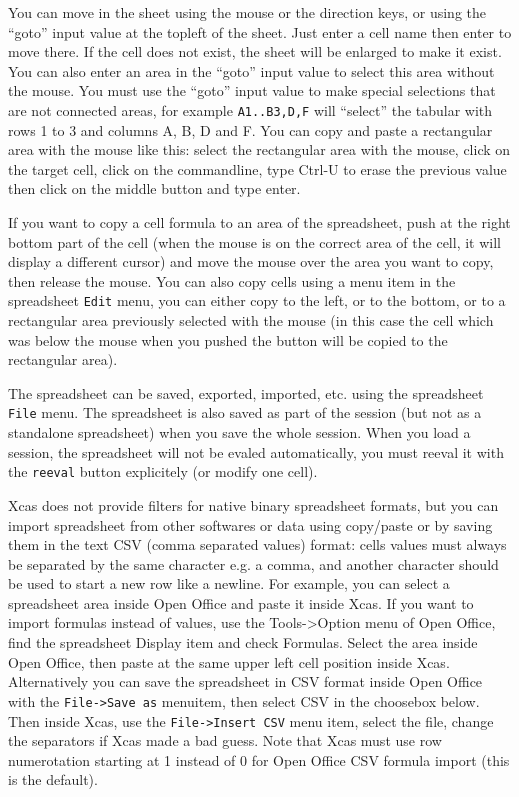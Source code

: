 \documentclass{article}
\begin{document}
You can move in the sheet using the mouse or the direction keys, or
using the ``goto'' input value at the topleft of the sheet. Just enter
a cell name then enter to move there. If the cell does not exist,
the sheet will be enlarged to make it exist. You can also enter
an area in the ``goto'' input value to select this area without the
mouse. You must use the ``goto'' input value to make special
selections that are not connected areas, for example \verb|A1..B3,D,F| will
``select'' the tabular with rows 1 to 3 and columns A, B, D and F.
You can copy and paste a rectangular area with the mouse like this:
select the rectangular area with the mouse, click on the target cell,
click on the commandline, type Ctrl-U to erase the previous
value then click on the middle button and type enter.

If you want to copy a cell formula to an area of the spreadsheet,
push at the right bottom part of the cell (when the mouse is on the
correct area of the cell, it will display a different cursor)
and move the mouse over the area you want to
copy, then release the mouse.
You can also copy cells using a menu item in the spreadsheet
\verb|Edit| menu, you can either copy to the left, or to the bottom,
or to a rectangular area previously selected with the mouse (in this
case the cell which was below the mouse when you pushed the button
will be copied to the rectangular area).

The spreadsheet can be saved, exported, imported, etc. using the
spreadsheet \verb|File| menu. The spreadsheet is also saved 
as part of the session (but not as a standalone spreadsheet)
when you save the whole session. When you load a session, the
spreadsheet will not be evaled automatically, you must reeval
it with the \verb|reeval| button explicitely (or modify one cell).

Xcas does not provide filters for native binary spreadsheet formats,
but you can import spreadsheet from other softwares or data using
copy/paste or by saving them in the text CSV (comma separated values) format:
cells values must always be separated by the same character e.g. a comma, and
another character should be used to start a new row like a newline.
For example, you can select a spreadsheet area inside Open Office
and paste it inside Xcas.
If you want to import formulas instead of values,
use the Tools->Option menu of Open Office, find the spreadsheet Display item
and check Formulas. Select the area inside Open Office, then
paste at the same upper left cell position inside Xcas.
Alternatively you can save the spreadsheet in CSV format inside
Open Office with the \verb|File->Save as| 
menuitem, then select CSV in the choosebox below. 
Then inside Xcas, use the \verb|File->Insert CSV| menu item,
select the file, change the separators if Xcas made a bad guess.
Note that Xcas must use row numerotation starting
at 1 instead of 0 for Open Office CSV formula import (this is the default).
\end{document}
